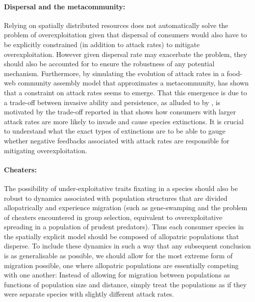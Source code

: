 \documentclass[a4paper]{report}
\begin{document}
\paragraph{Dispersal and the metacommunity:} Relying on spatially distributed resources does not automatically solve the problem of overexploitation given that dispersal of consumers would also have to be explicitly constrained (in addition to attack rates) to mitigate overexploitation. However given dispersal rate may exacerbate the problem, they should also be accounted for to ensure the robustness of any potential mechanism. Furthermore, by simulating the evolution of attack rates in a food-web community assembly model that approximates a metacommunity, \citep{Rossberg2008} has shown that a constraint on attack rates seems to emerge. That this emergence is due to a trade-off between invasive ability and persistence, as alluded to by \citep{Goodnight2008}, is motivated by the trade-off reported in \citep{Pawar2009} that shows how consumers with larger attack rates are more likely to invade and cause species extinctions. It is crucial to understand what the exact types of extinctions are to be able to gauge whether negative feedbacks associated with attack rates are responsible for mitigating overexploitation.\\

\paragraph{Cheaters:} The possibility of under-exploitative traits fixating in a species should also be robust to dynamics associated with population structures that are divided allopatrically and experience migration (such as gene-swamping \citep{Thomas2002} and the problem of cheaters encountered in group selection, equivalent to overexploitative spreading in a population of prudent predators). Thus each consumer species in the spatially explicit model should be composed of allopatric populations that disperse. To include these dynamics in such a way that any subsequent conclusion is as generalisable as possible, we should allow for the most extreme form of migration possible, one where allopatric populations are essentially competing with one another: Instead of allowing for migration between populations as functions of population size and distance, simply treat the populations as if they were separate species with slightly different attack rates. \\
\end{document}

